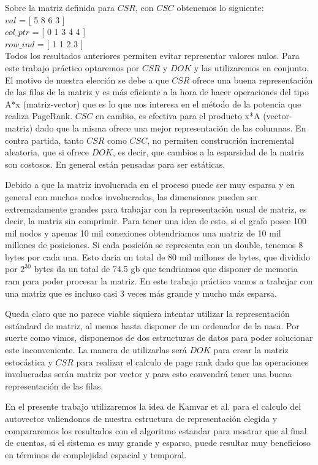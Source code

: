Sobre la matriz definida para $CSR$, con $CSC$ obtenemos lo siguiente: \\

   $val$  = [ 5 8 6 3 ] \\
   $col\_ptr$ = [ 0 1 3 4 4 ] \\   
   $row\_ind$ = [ 1 1 2 3 ] \\

Todos los resultados anteriores permiten evitar representar valores nulos.
Para este trabajo práctico optaremos por $CSR$ y $DOK$ y las utilizaremos en conjunto.  	
El motivo de nuestra elección se debe a que $CSR$ ofrece una buena representación de las filas de la matriz y es más eficiente a la hora de hacer operaciones del tipo A*x (matriz-vector) que es lo que nos interesa en el método de la potencia que realiza PageRank. $CSC$ en cambio, es efectiva para el producto x*A (vector-matriz) dado que la misma ofrece una mejor representación de las columnas. En contra partida, tanto $CSR$ como $CSC$, no permiten construcción incremental aleatoria, que si ofrece $DOK$, es decir, que cambios a la esparsidad de la matriz son costosos. En general están pensadas para ser estáticas.

Debido a que la matriz involucrada en el proceso puede ser muy esparsa y en general con muchos nodos involucrados, las dimensiones pueden ser extremadamente grandes para trabajar con la representación usual de matriz, es decir, la matriz sin comprimir. Para tener una idea de esto, si el grafo posee 100 mil nodos y apenas 10 mil conexiones obtendriamos una matriz de 10 mil millones de posiciones. Si cada posición se representa con un double, tenemos 8 bytes por cada una. Esto daria un total de 80 mil millones de bytes, que dividido por $2^{30}$ bytes da un total de 74.5 gb que tendriamos que disponer de memoria ram para poder procesar la matriz. En este trabajo práctico vamos a trabajar con una matriz que es incluso casi 3 veces más grande y mucho más esparsa.  

Queda claro que no parece viable siquiera intentar utilizar la representación estándard de matriz, al menos hasta disponer de un ordenador de la nasa. Por suerte como vimos, disponemos de dos estructuras de datos para poder solucionar este inconveniente. La manera de utilizarlas será $DOK$ para crear la matriz estocástica y $CSR$ para realizar el calculo de page rank dado que las operaciones involucradas serán matriz por vector y para esto convendrá tener una buena representación de las filas.  

En el presente trabajo utilizaremos la idea de Kamvar et al. \cite[Algoritmo 1]{Kamvar2003} para el calculo del autovector valiendonos de nuestra estructura de representación elegida y compararemos los resultados con el algoritmo estandar para mostrar que al final de cuentas, si el sistema es muy grande y esparso, puede resultar muy beneficioso en términos de complejidad espacial y temporal.